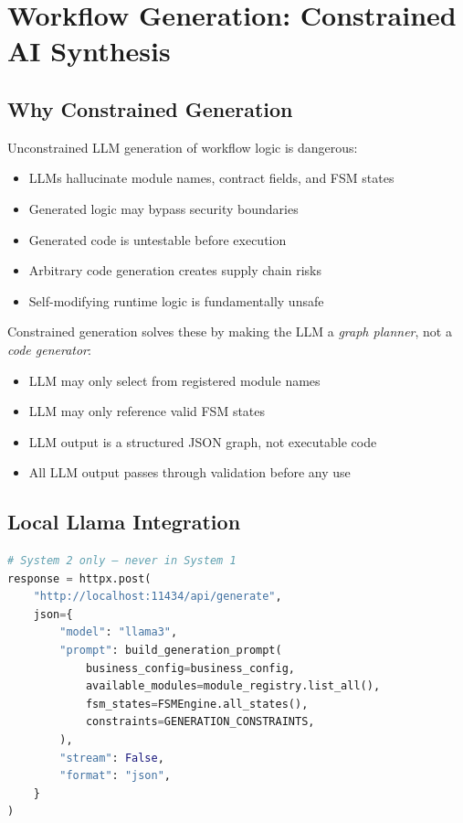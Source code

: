 \documentclass[12pt, a4paper]{report}
\begin{document}
\chapter{Workflow Generation: Constrained AI Synthesis}

\section{Why Constrained Generation}

Unconstrained LLM generation of workflow logic is dangerous:
\begin{itemize}
  \item LLMs hallucinate module names, contract fields, and FSM states
  \item Generated logic may bypass security boundaries
  \item Generated code is untestable before execution
  \item Arbitrary code generation creates supply chain risks
  \item Self-modifying runtime logic is fundamentally unsafe
\end{itemize}

Constrained generation solves these by making the LLM a \textit{graph planner}, not a \textit{code generator}:
\begin{itemize}
  \item LLM may only select from registered module names
  \item LLM may only reference valid FSM states
  \item LLM output is a structured JSON graph, not executable code
  \item All LLM output passes through validation before any use
\end{itemize}

\section{Local Llama Integration}

\begin{lstlisting}[language=Python, caption={Local Llama Call Pattern}]
# System 2 only — never in System 1
response = httpx.post(
    "http://localhost:11434/api/generate",
    json={
        "model": "llama3",
        "prompt": build_generation_prompt(
            business_config=business_config,
            available_modules=module_registry.list_all(),
            fsm_states=FSMEngine.all_states(),
            constraints=GENERATION_CONSTRAINTS,
        ),
        "stream": False,
        "format": "json",
    }
)
\end{lstlisting}
\end{document}
